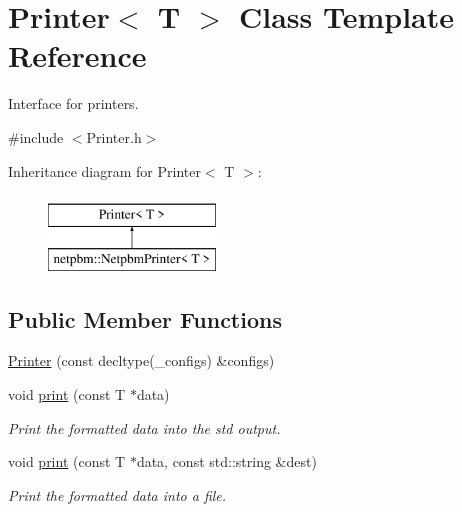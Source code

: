 \hypertarget{class_printer}{}\section{Printer$<$ T $>$ Class Template Reference}
\label{class_printer}


Interface for printers.  




{\ttfamily \#include $<$Printer.\+h$>$}

Inheritance diagram for Printer$<$ T $>$\+:\begin{figure}[H]
\begin{center}
\leavevmode
\includegraphics[height=2.000000cm]{class_printer}
\end{center}
\end{figure}
\subsection*{Public Member Functions}
\begin{DoxyCompactItemize}
\item 
\mbox{\hyperlink{class_printer_adac6b3612e6179501f522964de56f70d}{Printer}} (const decltype(\+\_\+configs) \&configs)
\item 
void \mbox{\hyperlink{class_printer_a93330573e6905facd02e08e7f18b4f8a}{print}} (const T $\ast$data)
\begin{DoxyCompactList}\small\item\em Print the formatted data into the std output. \end{DoxyCompactList}\item 
void \mbox{\hyperlink{class_printer_af5d56046873ae78f533f240a3f55343d}{print}} (const T $\ast$data, const std\+::string \&dest)
\begin{DoxyCompactList}\small\item\em Print the formatted data into a file. \end{DoxyCompactList}\end{DoxyCompactItemize}
